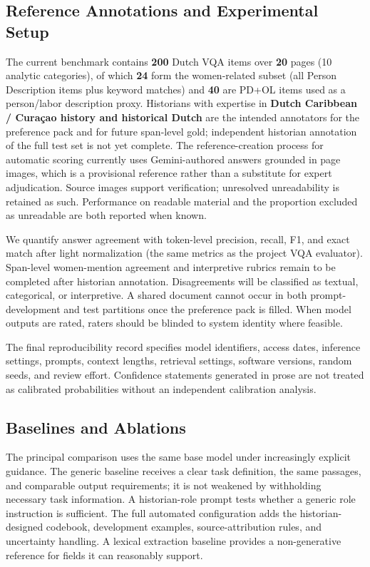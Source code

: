 \documentclass[sigconf]{acmart}
\begin{document}
\subsection{Reference Annotations and Experimental Setup}

The current benchmark contains \textbf{200} Dutch VQA items over \textbf{20} pages (10 analytic categories), of which \textbf{24} form the women-related subset (all Person Description items plus keyword matches) and \textbf{40} are PD+OL items used as a person/labor description proxy. Historians with expertise in \textbf{Dutch Caribbean / Cura\c{c}ao history and historical Dutch} are the intended annotators for the preference pack and for future span-level gold; independent historian annotation of the full test set is not yet complete. The reference-creation process for automatic scoring currently uses Gemini-authored answers grounded in page images, which is a provisional reference rather than a substitute for expert adjudication. Source images support verification; unresolved unreadability is retained as such. Performance on readable material and the proportion excluded as unreadable are both reported when known.

We quantify answer agreement with token-level precision, recall, F1, and exact match after light normalization (the same metrics as the project VQA evaluator). Span-level women-mention agreement and interpretive rubrics remain to be completed after historian annotation. Disagreements will be classified as textual, categorical, or interpretive. A shared document cannot occur in both prompt-development and test partitions once the preference pack is filled. When model outputs are rated, raters should be blinded to system identity where feasible.

The final reproducibility record specifies model identifiers, access dates, inference settings, prompts, context lengths, retrieval settings, software versions, random seeds, and review effort. Confidence statements generated in prose are not treated as calibrated probabilities without an independent calibration analysis.

\subsection{Baselines and Ablations}

The principal comparison uses the same base model under increasingly explicit guidance. The generic baseline receives a clear task definition, the same passages, and comparable output requirements; it is not weakened by withholding necessary task information. A historian-role prompt tests whether a generic role instruction is sufficient. The full automated configuration adds the historian-designed codebook, development examples, source-attribution rules, and uncertainty handling. A lexical extraction baseline provides a non-generative reference for fields it can reasonably support.
\end{document}
